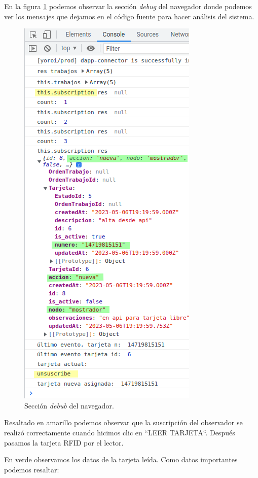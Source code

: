 En la figura \ref{fig:ensayonueva1-2} podemos observar la sección \textit{debug} del navegador donde podemos ver los mensajes que dejamos en el código fuente para hacer análisis del sistema.

\begin{figure}[H]
	\centering
	\includegraphics[scale=.60]{./Figures/ensayo-1/5.nueva-2.png}
	\caption{Sección \textit{debub} del navegador.}
	\label{fig:ensayonueva1-2}
\end{figure}

Resaltado en amarillo podemos observar que la suscripción del observador se realizó correctamente cuando hicimos clic en ``LEER TARJETA``. Después pasamos la tarjeta RFID por el lector. 

En verde observamos los datos de la tarjeta leída. Como datos importantes podemos resaltar:

